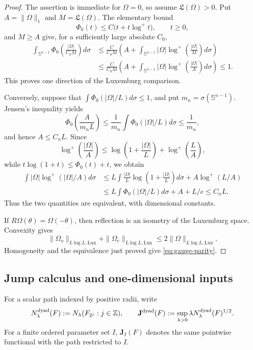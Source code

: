 \documentclass[11pt]{article}
\numberwithin{equation}{section}
\theoremstyle{remark}
\theoremstyle{definition}
\newcommand{\Sph}{\mathbb S}
\begin{document}
\begin{proof}
The assertion is immediate for $\Omega=0$, so assume
$\mathfrak L(\Omega)>0$.
Put $A=\|\Omega\|_1$ and $M=\mathfrak L(\Omega)$.  The elementary bound
\[
 \Phi_0(t)\le C\bigl(t+t\log^+t\bigr),\qquad t\ge0,
\]
and $M\ge A$ give, for a sufficiently large absolute $C_0$,
\begin{align*}
 \int_{\Sph^{n-1}}\Phi_0\!\left(\frac{|\Omega|}{C_0M}\right)d\sigma
 &\le \frac C{C_0M}\left(A+
   \int_{\Sph^{n-1}}|\Omega|
      \log^+\!\left(\frac{|\Omega|}{M}\right)d\sigma\right)\\
 &\le \frac C{C_0M}\left(A+
   \int_{\Sph^{n-1}}|\Omega|
      \log^+\!\left(\frac{|\Omega|}{A}\right)d\sigma\right)
 \le1.
\end{align*}
This proves one direction of the Luxemburg comparison.

Conversely, suppose that
$\int\Phi_0(|\Omega|/L)d\sigma\le1$, and put
$m_n=\sigma(\Sph^{n-1})$.  Jensen's inequality yields
\[
 \Phi_0\!\left(\frac{A}{m_nL}\right)
 \le\frac1{m_n}\int\Phi_0(|\Omega|/L)d\sigma
 \le\frac1{m_n},
\]
and hence $A\le C_nL$.  Since
\[
 \log^+\!\left(\frac{|\Omega|}{A}\right)
 \le \log\!\left(1+\frac{|\Omega|}{L}\right)
      +\log^+\!\left(\frac L A\right),
\]
while $t\log(1+t)\le\Phi_0(t)+t$, we obtain
\begin{align*}
 \int|\Omega|\log^+(|\Omega|/A)d\sigma
 &\le L\int\frac{|\Omega|}{L}
          \log\!\left(1+\frac{|\Omega|}{L}\right)d\sigma
       +A\log^+(L/A)\\
 &\le L\int\Phi_0(|\Omega|/L)d\sigma+A+L/e
 \le C_nL.
\end{align*}
Thus the two quantities are equivalent, with dimensional constants.

If $R\Omega(\theta)=\Omega(-\theta)$, then reflection is an isometry of
the Luxemburg space.  Convexity gives
\[
 \|\Omega_o\|_{L\log L,\mathrm{Lux}}
 +\|\Omega_e\|_{L\log L,\mathrm{Lux}}
 \le2\|\Omega\|_{L\log L,\mathrm{Lux}}.
\]
Homogeneity and the equivalence just proved give
\eqref{eq:gauge-parity}.
\end{proof}

\subsection{Jump calculus and one-dimensional inputs}

For a scalar path indexed by positive radii, write
\begin{equation}\label{eq:dyadic-jump-definition}
 N^{\rm dyad}_\lambda(F):=
 N_\lambda(F_{2^j}:j\in\mathbb Z),
 \qquad
 \mathbf J^{\rm dyad}(F)
 :=\sup_{\lambda>0}\lambda
 N^{\rm dyad}_\lambda(F)^{1/2}.
\end{equation}
For a finite ordered parameter set $I$, $\mathbf J_I(F)$ denotes the same
pointwise functional with the path restricted to $I$.
\end{document}
